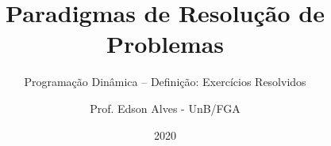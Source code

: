 \title{Paradigmas de Resolução de Problemas}
\subtitle{Programação Dinâmica -- Definição: Exercícios Resolvidos}
\author{Prof. Edson Alves - UnB/FGA}
\date{2020}
